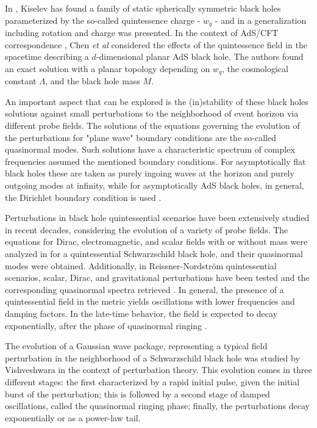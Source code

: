 \documentclass[preprint]{revtex4-1}
\begin{document}
In \cite{0264-9381-20-6-310}, Kiselev has found a family of static spherically symmetric black holes parameterized by the so-called quintessence charge - $w_q$ - and in \cite{Xu:2016jod} a generalization including rotation and charge was presented. In the context of AdS/CFT correspondence \cite{Maldacena:1997re,Witten:1998qj,1126-6708-2008-12-015}, Chen {\it{et al}}  \cite{Chen:2012mva} considered the effects of the quintessence field in the spacetime describing a $d$-dimensional planar AdS black hole. The authors found an exact solution with a planar topology depending on $w_q$, the cosmological constant $\Lambda$, and the black hole mass $M$. 

An important aspect that can be explored is the (in)stability of these black holes solutions against small perturbations to the neighborhood of event horizon via different probe fields. The solutions of the equations governing the evolution of the perturbations for "plane wave" boundary conditions are the so-called quasinormal modes. Such solutions have a characteristic spectrum of complex frequencies assumed the mentioned boundary conditions. For asymptotically flat black holes these are taken as purely ingoing waves at the horizon and purely outgoing modes at infinity, while for asymptotically AdS black holes, in general, the Dirichlet boundary condition is used \cite{Kokkotas:1999bd,Berti:2009kk,Konoplya:2011qq}.

Perturbations in black hole quintessential scenarios have been extensively studied in recent decades, considering the evolution of a variety of probe fields. The equations for Dirac, electromagnetic, and scalar fields with or without mass were analyzed in \cite{Chen:2005qh, Guo:2013mna, Ma:2006by, Zhang:2007nu,Zhang:2006hh,Varghese:2014xaa} for a quintessential Schwarzschild black hole, and their quasinormal modes were obtained. Additionally, in Reissner-Nordström quintessential scenarios, scalar, Dirac, and gravitational perturbations have been tested and the corresponding quasinormal spectra retrieved \cite{Varghese:2008ky, Wang:2009hr, Saleh:2009zz}. In general, the presence of a quintessential field in the metric yields oscillations with lower frequencies and damping factors. In the late-time behavior, the field is expected to decay exponentially, after the phase of quasinormal ringing \cite{Varghese:2014xaa}.


The evolution of a Gaussian wave package, representing a typical field perturbation in the neighborhood of a Schwarzschild black hole was studied by Vishveshwara \cite{Vishveshwara:1970zz} in the context of perturbation theory. This evolution comes in three different stages: the first characterized by a rapid initial pulse, given the initial burst of the perturbation; this is followed by a second stage of damped oscillations, called the quasinormal ringing phase; finally, the perturbations decay exponentially or as a power-law tail.
\end{document}
